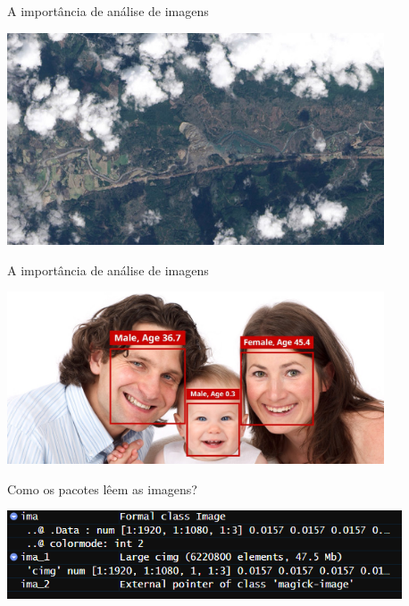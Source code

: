 \documentclass[
  ignorenonframetext,
]{beamer}
\begin{document}
\begin{frame}{A importância de análise de imagens}
\protect\hypertarget{a-importuxe2ncia-de-anuxe1lise-de-imagens-1}{}

\small

\includegraphics[width=4.4in]{IMAGENS/satelite}

\begin{center}
\tiny{}
\end{center}

\end{frame}

\begin{frame}{A importância de análise de imagens}
\protect\hypertarget{a-importuxe2ncia-de-anuxe1lise-de-imagens-2}{}

\small

\includegraphics[width=4.4in]{IMAGENS/facial}

\begin{center}
\tiny{}
\end{center}

\end{frame}

\begin{frame}{Como os pacotes lêem as imagens?}
\protect\hypertarget{como-os-pacotes-luxeaem-as-imagens}{}

\small

\includegraphics[width=4.6in]{IMAGENS/R_le}

\begin{center}
\tiny{}
\end{center}

\end{frame}
\end{document}
